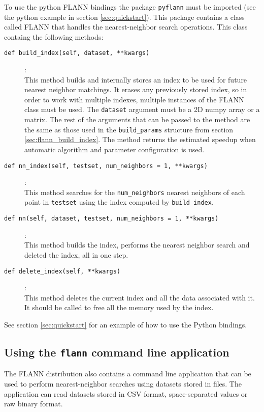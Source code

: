 \documentclass[letter,10pt]{article}
\begin{document}
To use the python FLANN bindings the package \texttt{pyflann} must be imported
(see the python example in section \ref{sec:quickstart}). This package contains
a class called FLANN that handles the nearest-neighbor search operations. This
class containg the following methods:
\begin{description}
\item [\texttt{def build\_index(self, dataset, **kwargs)}] :\\
    This method builds and internally stores an index to be used for future
nearest neighbor matchings. It erases any previously stored index, so in order
to work with multiple indexes, multiple instances of the FLANN class must be
used. The \texttt{dataset} argument must be a 2D numpy array or a matrix. The
rest of the arguments that can be passed to the method are the same as
 those used in the \texttt{build\_params} structure from
section \ref{sec:flann_build_index}. The method returns the estimated speedup
when automatic algorithm and parameter configuration is used.

\item [\texttt{def nn\_index(self, testset, num\_neighbors = 1, **kwargs)}] :\\
    This method searches for the \texttt{num\_neighbors} nearest neighbors of
each point in \texttt{testset} using the index computed by
\texttt{build\_index}.

\item[\texttt{def nn(self, dataset, testset, num\_neighbors = 1, **kwargs)}]:\\
    This method builds the index, performs the nearest neighbor search and
deleted the index, all in one step.

\item [\texttt{def delete\_index(self, **kwargs)}] :\\
    This method deletes the current index and all the data associated with it.
It should be called to free all the memory used by the index.

\end{description}


See section \ref{sec:quickstart} for an example of how to use the Python
bindings.


\subsection{Using the \texttt{flann} command line application}

The FLANN distribution also contains a command line application that can be
used to perform nearest-neighbor searches using datasets stored in files. The
application can read datasets stored in CSV format, space-separated values or
raw binary format.
\end{document}

